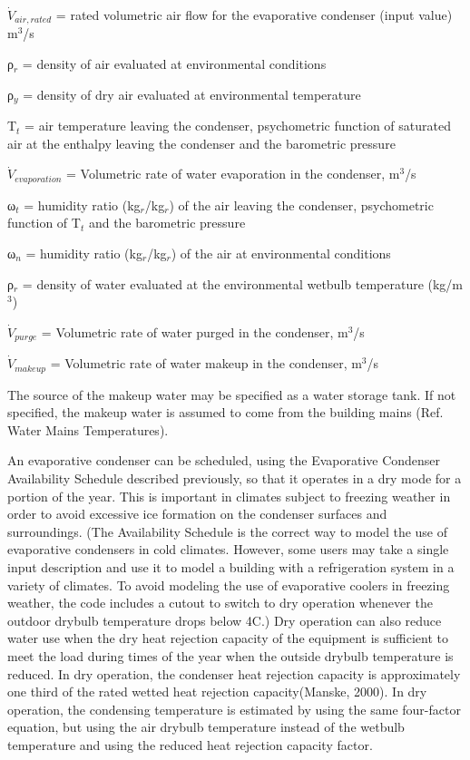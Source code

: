 \({\dot V_{air,rated}}\) = rated volumetric air flow for the evaporative condenser (input value) m\(^{3}\)/s

ρ\(_{r}\) = density of air evaluated at environmental conditions

ρ\(_{y}\) = density of dry air evaluated at environmental temperature

T\(_{t}\) = air temperature leaving the condenser, psychometric function of saturated air at the enthalpy leaving the condenser and the barometric pressure

\({\dot V_{evaporation}}\) = Volumetric rate of water evaporation in the condenser, m\(^{3}\)/s

ω\(_{t}\) = humidity ratio (kg\(_{r}\)/kg\(_{r}\)) of the air leaving the condenser, psychometric function of T\(_{t}\) and the barometric pressure

ω\(_{n}\) = humidity ratio (kg\(_{r}\)/kg\(_{r}\)) of the air at environmental conditions

ρ\(_{r}\) = density of water evaluated at the environmental wetbulb temperature (kg/m\(^{3}\))

\({\dot V_{purge}}\) = Volumetric rate of water purged in the condenser, m\(^{3}\)/s

\({\dot V_{makeup}}\) = Volumetric rate of water makeup in the condenser, m\(^{3}\)/s

The source of the makeup water may be specified as a water storage tank. If not specified, the makeup water is assumed to come from the building mains (Ref. Water Mains Temperatures).

An evaporative condenser can be scheduled, using the Evaporative Condenser Availability Schedule described previously, so that it operates in a dry mode for a portion of the year. This is important in climates subject to freezing weather in order to avoid excessive ice formation on the condenser surfaces and surroundings. (The Availability Schedule is the correct way to model the use of evaporative condensers in cold climates. However, some users may take a single input description and use it to model a building with a refrigeration system in a variety of climates. To avoid modeling the use of evaporative coolers in freezing weather, the code includes a cutout to switch to dry operation whenever the outdoor drybulb temperature drops below 4C.) Dry operation can also reduce water use when the dry heat rejection capacity of the equipment is sufficient to meet the load during times of the year when the outside drybulb temperature is reduced. In dry operation, the condenser heat rejection capacity is approximately one third of the rated wetted heat rejection capacity(Manske, 2000). In dry operation, the condensing temperature is estimated by using the same four-factor equation, but using the air drybulb temperature instead of the wetbulb temperature and using the reduced heat rejection capacity factor.

